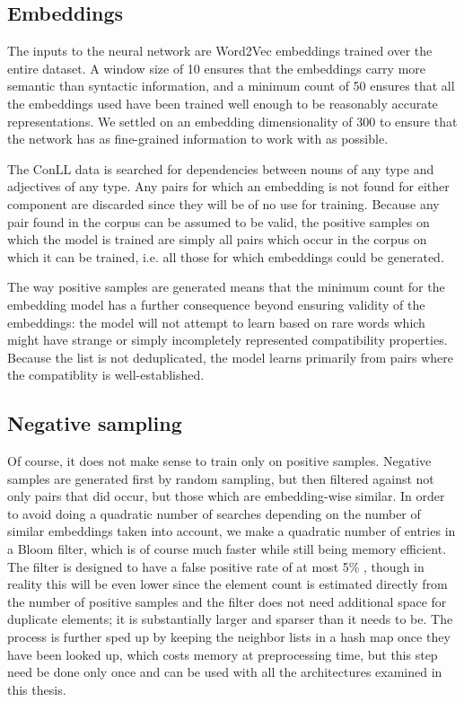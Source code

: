 \documentclass[a4paper, 11pt]{scrartcl}
\begin{document}
\subsection{Embeddings}

The inputs to the neural network are Word2Vec embeddings trained over the entire dataset. A window size of 10 ensures that the embeddings carry more semantic than syntactic information, and a minimum count of 50 ensures that all the embeddings used have been trained well enough to be reasonably accurate representations. We settled on an embedding dimensionality of 300 to ensure that the network has as fine-grained information to work with as possible.

The ConLL data is searched for dependencies between nouns of any type and adjectives of any type. Any pairs for which an embedding is not found for either component are discarded since they will be of no use for training. Because any pair found in the corpus can be assumed to be valid, the positive samples on which the model is trained are simply all pairs which occur in the corpus on which it can be trained, i.e. all those for which embeddings could be generated.

The way positive samples are generated means that the minimum count for the embedding model has a further consequence beyond ensuring validity of the embeddings: the model will not attempt to learn based on rare words which might have strange or simply incompletely represented compatibility properties. Because the list is not deduplicated, the model learns primarily from pairs where the compatiblity is well-established.

\subsection{Negative sampling}

Of course, it does not make sense to train only on positive samples. Negative samples are generated first by random sampling, but then filtered against not only pairs that did occur, but those which are embedding-wise similar. In order to avoid doing a quadratic number of searches depending on the number of similar embeddings taken into account, we make a quadratic number of entries in a Bloom filter, which is of course much faster while still being memory efficient. The filter is designed to have a false positive rate of at most 5\% , though in reality this will be even lower since the element count is estimated directly from the number of positive samples and the filter does not need additional space for duplicate elements; it is substantially larger and sparser than it needs to be. The process is further sped up by keeping the neighbor lists in a hash map once they have been looked up, which costs memory at preprocessing time, but this step need be done only once and can be used with all the architectures examined in this thesis.
\end{document}
